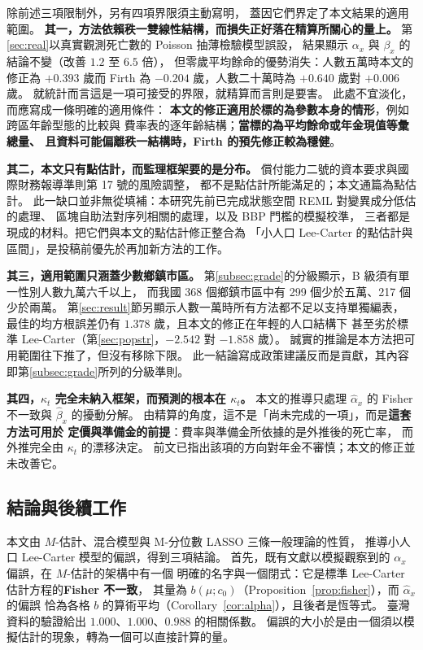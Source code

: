 \documentclass[UTF8, fontset=macnew, a4paper, 12pt]{ctexart}
\begin{document}
除前述三項限制外，另有四項界限須主動寫明，
蓋因它們界定了本文結果的適用範圍。
\textbf{其一，方法依賴秩一雙線性結構，而損失正好落在精算所關心的量上。}
第\ref{sec:real}以真實觀測死亡數的 Poisson 抽薄檢驗模型誤設，
結果顯示 $\alpha_x$ 與 $\beta_x$ 的結論不變（改善 $1.2$ 至 $6.5$ 倍），
但零歲平均餘命的優勢消失：人數五萬時本文的修正為 $+0.393$ 歲而
Firth 為 $-0.204$ 歲，人數二十萬時為 $+0.640$ 歲對 $+0.006$ 歲。
就統計而言這是一項可接受的界限，就精算而言則是要害。
此處不宜淡化，而應寫成一條明確的適用條件：
\textbf{本文的修正適用於標的為參數本身的情形}，例如跨區年齡型態的比較與
費率表的逐年齡結構；\textbf{當標的為平均餘命或年金現值等彙總量、
且資料可能偏離秩一結構時，Firth 的預先修正較為穩健}。

\textbf{其二，本文只有點估計，而監理框架要的是分布。}
償付能力二號的資本要求與國際財務報導準則第 17 號的風險調整，
都不是點估計所能滿足的；本文通篇為點估計。
此一缺口並非無從填補：本研究先前已完成狀態空間 REML 對變異成分低估的處理、
區塊自助法對序列相關的處理，以及 BBP 門檻的模擬校準，
三者都是現成的材料。把它們與本文的點估計修正整合為
「小人口 Lee-Carter 的點估計與區間」，是投稿前優先於再加新方法的工作。

\textbf{其三，適用範圍只涵蓋少數鄉鎮市區。}
第\ref{subsec:grade}的分級顯示，B 級須有單一性別人數九萬六千以上，
而我國 368 個鄉鎮市區中有 299 個少於五萬、217 個少於兩萬。
第\ref{sec:result}節另顯示人數一萬時所有方法都不足以支持單獨編表，
最佳的均方根誤差仍有 $1.378$ 歲，且本文的修正在年輕的人口結構下
甚至劣於標準 Lee-Carter（第\ref{sec:popstr}，$-2.542$ 對 $-1.858$ 歲）。
誠實的推論是本方法把可用範圍往下推了，但沒有移除下限。
此一結論寫成政策建議反而是貢獻，其內容即第\ref{subsec:grade}所列的分級準則。

\textbf{其四，$\kappa_t$ 完全未納入框架，而預測的根本在 $\kappa_t$。}
本文的推導只處理 $\hat\alpha_x$ 的 Fisher 不一致與 $\hat\beta_x$ 的擾動分解。
由精算的角度，這不是「尚未完成的一項」，而是\textbf{這套方法可用於
定價與準備金的前提}：費率與準備金所依據的是外推後的死亡率，
而外推完全由 $\kappa_t$ 的漂移決定。
前文已指出該項的方向對年金不審慎；本文的修正並未改善它。

\subsection{結論與後續工作}\label{subsec:concl}\label{subsec:future}

本文由 $M$-估計、混合模型與 M-分位數 LASSO 三條一般理論的性質，
推導小人口 Lee-Carter 模型的偏誤，得到三項結論。
首先，既有文獻以模擬觀察到的 $\alpha_x$ 偏誤，在 $M$-估計的架構中有一個
明確的名字與一個閉式：它是標準 Lee-Carter 估計方程的\textbf{Fisher 不一致}，
其量為 $b(\mu;c_0)$（Proposition~\ref{prop:fisher}），而 $\hat\alpha_x$ 的偏誤
恰為各格 $b$ 的算術平均（Corollary~\ref{cor:alpha}），且後者是恆等式。
臺灣資料的驗證給出 $1.000$、$1.000$、$0.988$ 的相關係數。
偏誤的大小於是由一個須以模擬估計的現象，轉為一個可以直接計算的量。
\end{document}
